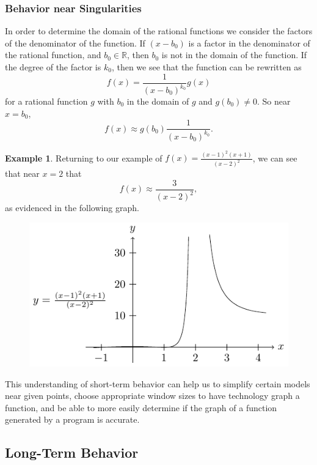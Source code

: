\documentclass[
]{book}
\theoremstyle{definition}
\theoremstyle{definition}
\newtheorem{example}{Example}[chapter]
\theoremstyle{definition}
\theoremstyle{definition}
\theoremstyle{remark}
\begin{document}
\hypertarget{behavior-near-singularities}{%
\subsubsection{Behavior near Singularities}\label{behavior-near-singularities}}

In order to determine the domain of the rational functions we consider the factors of the denominator of the function. If \((x-b_0)\) is a factor in the denominator of the rational function, and \(b_0\in \mathbb{R}\), then \(b_0\) is not in the domain of the function. If the degree of the factor is \(k_0\), then we see that the function can be rewritten as \[f(x)= \frac{1}{(x-b_0)^{k_0}} g(x)\] for a rational function \(g\) with \(b_0\) in the domain of \(g\) and \(g(b_0)\neq 0\). So near \(x=b_0\), \[f(x) \approx g(b_0) \frac{1}{(x-b_0)^{k_0}}.\]

\begin{example}

Returning to our example of \(f(x)=\frac{(x-1)^2(x+1)}{(x-2)^2}\), we can see that near \(x=2\) that
\[f(x) \approx \frac{3}{(x-2)^2},\] as evidenced in the following graph.

\begin{figure}

{\centering \includegraphics[width=0.5\linewidth]{tikz/rational2} 

}

\end{figure}

\end{example}

This understanding of short-term behavior can help us to simplify certain models near given points, choose appropriate window sizes to have technology graph a function, and be able to more easily determine if the graph of a function generated by a program is accurate.

\hypertarget{long-term-behavior-1}{%
\subsection{Long-Term Behavior}\label{long-term-behavior-1}}
\end{document}
